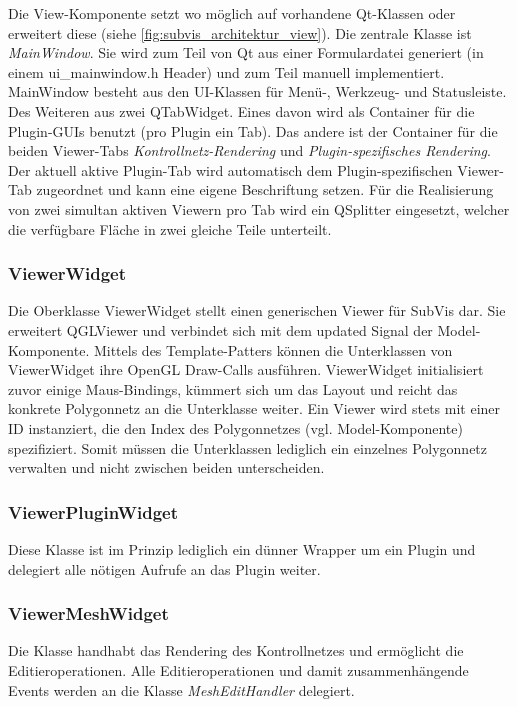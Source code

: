 Die View-Komponente setzt wo möglich auf vorhandene Qt-Klassen oder erweitert diese (siehe \autoref{fig:subvis_architektur_view}).
Die zentrale Klasse ist \emph{MainWindow}. 
Sie wird zum Teil von Qt aus einer Formulardatei generiert (in einem ui\_mainwindow.h Header) und zum Teil manuell implementiert.
MainWindow besteht aus den UI-Klassen für Menü-, Werkzeug- und Statusleiste.
Des Weiteren aus zwei QTabWidget.
Eines davon wird als Container für die Plugin-GUIs benutzt (pro Plugin ein Tab).
Das andere ist der Container für die beiden Viewer-Tabs \emph{Kontrollnetz-Rendering} und \emph{Plugin-spezifisches Rendering}.
Der aktuell aktive Plugin-Tab wird automatisch dem Plugin-spezifischen Viewer-Tab zugeordnet und kann eine eigene Beschriftung setzen.
Für die Realisierung von zwei simultan aktiven Viewern pro Tab wird ein QSplitter eingesetzt, welcher die verfügbare Fläche in zwei gleiche Teile unterteilt.

\subsubsection{ViewerWidget}

Die Oberklasse ViewerWidget stellt einen generischen Viewer für SubVis dar.
Sie erweitert QGLViewer und verbindet sich mit dem updated Signal der Model-Komponente.
Mittels des Template-Patters können die Unterklassen von ViewerWidget ihre OpenGL Draw-Calls ausführen.
ViewerWidget initialisiert zuvor einige Maus-Bindings, kümmert sich um das Layout und reicht das konkrete Polygonnetz an die Unterklasse weiter.
Ein Viewer wird stets mit einer ID instanziert, die den Index des Polygonnetzes (vgl. Model-Komponente) spezifiziert.
Somit müssen die Unterklassen lediglich ein einzelnes Polygonnetz verwalten und nicht zwischen beiden unterscheiden.

\subsubsection{ViewerPluginWidget}

Diese Klasse ist im Prinzip lediglich ein dünner Wrapper um ein Plugin und delegiert alle nötigen Aufrufe an das Plugin weiter.

\subsubsection{ViewerMeshWidget}

Die Klasse handhabt das Rendering des Kontrollnetzes und ermöglicht die Editieroperationen.
Alle Editieroperationen und damit zusammenhängende Events werden an die Klasse \emph{MeshEditHandler} delegiert.



